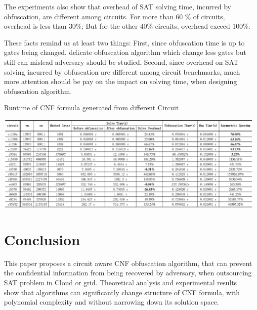 \documentclass[conference]{IEEEtran}
\begin{document}
The experiments also show that overhead of SAT solving time, incurred by obfuscation, 
are different among circuits.
For more than 60 \% of circuits, overhead is less than 30\%; But for the other 40\% circuits, overhead exceed 100\%.

These facts remind us at least two things: 
First, since  obfuscation time is up to gates being changed, 
delicate obfuscation algorithm which change less gates but still can mislead adversary should be studied.
Second, since overhead on SAT solving incurred by obfuscation are different among circuit benchmarks, 
much more attention should be pay on the impact on solving time,  when designing obfuscation algorithm. 

\begin{table}
\caption{Runtime of CNF formula generated from different Circuit}
\centering
\includegraphics[width=18.2cm]{Experiment}
\label{fig_exp}
\end{table}

\section{Conclusion}
This paper proposes a circuit aware  CNF obfuscation algorithm, 
that can prevent the confidential information from being recovered by adversary, 
when outsourcing SAT problem in Cloud or grid.
Theoretical analysis and experimental results show that algorithms can significantly change structure of CNF formula, 
with polynomial complexity and without narrowing down its solution space.
\end{document}
